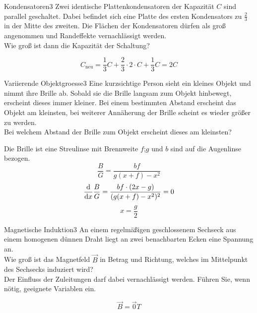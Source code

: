 



\begin{problem}{Kondensatoren}{3}
Zwei identische Plattenkondensatoren der Kapazität $C$ sind parallel geschaltet. Dabei befindet sich eine Platte des ersten Kondensators zu $\frac{2}{3}$ in der Mitte des zweiten. Die Flächen der Kondensatoren dürfen als groß angenommen und Randeffekte vernachlässigt werden.\\
Wie groß ist dann die Kapazität der Schaltung?
\begin{solution}
\[
C_\mathrm{neu}=\frac{1}{3}C+\frac{2}{3}\cdot 2\cdot C+\frac{1}{3}C=2C
\]
\end{solution}
\end{problem}


\begin{problem}{Variierende Objektgroesse}{3}
Eine kurzsichtige Person sieht ein kleines Objekt und nimmt ihre Brille ab. Sobald sie die Brille langsam zum Objekt hinbewegt, erscheint dieses immer kleiner. Bei einem bestimmten Abstand erscheint das Objekt am kleinsten, bei weiterer Annäherung der Brille scheint es wieder größer zu werden.\\
Bei welchem Abstand der Brille zum Objekt erscheint dieses am kleinsten?
\begin{solution}
Die Brille ist eine Streulinse mit Brennweite $f$;\qquad $g$ und $b$ sind auf die Augenlinse bezogen.
\[
\frac{B}{G}=\frac{b f}{g(x+f)-x^2}
\]
\[
\frac{\mathrm{d}}{\mathrm{d} x}\frac{B}{G}=\frac{b f\cdot (2x-g)}{(g(x+f)-x^2)^2}=0
\]
\[
x=\frac{g}{2}
\]
\end{solution}
\end{problem}


\begin{problem}{Magnetische Induktion}{3}
An einem regelmäßigen geschlossenem Sechseck aus einem homogenen dünnen Draht liegt an zwei benachbarten Ecken eine Spannung an.\\
Wie groß ist das Magnetfeld $\vec{B}$ in Betrag und Richtung, welches im Mittelpunkt des Sechsecks induziert wird?\\
Der Einfluss der Zuleitungen darf dabei vernachlässigt werden. Führen Sie, wenn nötig, geeignete Variablen ein.
\begin{solution}
\[
\vec{B}=\vec{0}\unit{T}
\]
\end{solution}
\end{problem}


